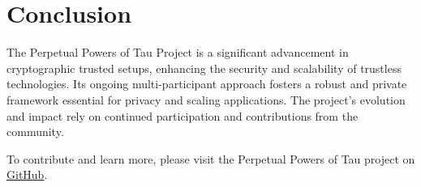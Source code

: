 \documentclass[11pt]{article}
\begin{document}
\section{Conclusion}
\label{sec:org1822061}

The Perpetual Powers of Tau Project is a significant advancement in cryptographic trusted setups, enhancing the security and scalability of trustless technologies. Its ongoing multi-participant approach fosters a robust and private framework essential for privacy and scaling applications. The project's evolution and impact rely on continued participation and contributions from the community.

To contribute and learn more, please visit the Perpetual Powers of Tau project on \href{https://github.com/privacy-scaling-explorations/perpetualpowersoftau/tree/master}{GitHub}.
\end{document}
